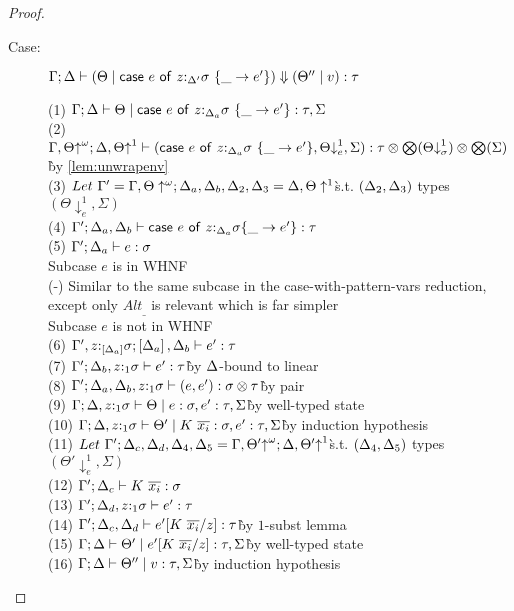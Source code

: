 \documentclass[acmsmall,review,screen]{acmart}
\newcommand{\ccase}[2]{\mathsf{case}~#1~\mathsf{of}~#2}
\begin{document}
\begin{proof}
\begin{description}
\begin{tabbing}
\end{tabbing}
\item[Case:] $\Gamma; \Delta \vdash (\Theta \mid \ccase{e}{z{:}_{\Delta'}\s~\{\_ \to e'}\}) \Downarrow (\Theta'' \mid v) : \tau$
\begin{tabbing}
    (1) $\Gamma; \Delta \vdash \Theta \mid \ccase{e}{z{:}_{\Delta_a}\s~\{\_ \to e'}\} : \tau, \Sigma$\\
    (2) $\G, \Theta{\uparrow}^\omega; \D, \Theta{\uparrow}^1 \vdash (\ccase{e}{z{:}_{\Delta_a}\s~\{\_ \to e'}\}, \Theta{\downarrow}^1_e, \Sigma) : \tau \otimes \bigotimes(\Theta{\downarrow}^1_\sigma) \otimes \bigotimes(\Sigma)$\`by \ref{lem:unwrapenv}\\
    (3) $Let~\Gamma' = \Gamma, \Theta\uparrow^\omega; \Delta_a,\Delta_b,\Delta_2,\Delta_3 = \Delta,\Theta\uparrow^1$\`s.t. $(\Delta_2,\Delta_3)$ types $(\Theta\downarrow^1_e, \Sigma)$\\
    (4) $\G'; \D_a, \D_b \vdash \ccase{e}{z{:}_{\D_a}\s\{\_ \to e'\}} : \tau$\\
    (5) $\Gamma'; \Delta_a \vdash e : \sigma$\\
    Subcase $e$ is in WHNF\\
    (-) Similar to the same subcase in the case-with-pattern-vars reduction,\\
        except only $Alt_{\_}$ is relevant which is far simpler\\
    Subcase $e$ is not in WHNF\\
    (6) $\Gamma', z{:}_{\left[\Delta_a\right]}\sigma; \left[\Delta_a\right], \Delta_b \vdash e' : \tau$\\
    (7) $\Gamma'; \Delta_b, z{:}_1\sigma \vdash e' : \tau$\` by $\Delta$-bound to linear\\
    (8) $\Gamma'; \Delta_a, \Delta_b, z{:}_1\sigma \vdash (e, e') : \sigma \otimes \tau$\` by pair\\
    (9) $\Gamma; \Delta, z{:}_1\sigma \vdash \Theta \mid e : \sigma, e' : \tau,
    \Sigma$\` by well-typed state\\
    (10) $\Gamma; \Delta, z{:}_1\sigma \vdash \Theta' \mid K~\overline{x_i} : \sigma, e' : \tau, \Sigma$\` by induction hypothesis\\
    (11) $Let~\Gamma';\Delta_c,\Delta_d,\Delta_4,\Delta_5 = \Gamma, \Theta'{\uparrow}^\omega; \Delta, \Theta'{\uparrow}^1$\`s.t. $(\Delta_4,\Delta_5)$ types $(\Theta'{\downarrow}^1_e, \Sigma)$\\
    (12) $\Gamma';\Delta_c \vdash K~\overline{x_i} : \sigma$\\
    (13) $\Gamma';\Delta_d,z{:}_1\sigma \vdash e' : \tau$\\
    (14) $\Gamma';\Delta_c, \Delta_d \vdash e'[K~\overline{x_i}/z] : \tau$\` by $1$-subst lemma\\
    (15) $\Gamma;\Delta \vdash \Theta' \mid e'[K~\overline{x_i}/z] : \tau, \Sigma$\` by well-typed state\\
    (16) $\Gamma;\Delta \vdash \Theta'' \mid v : \tau, \Sigma$\` by induction hypothesis\\
\end{tabbing}
\end{description}
\end{proof}
\end{document}
